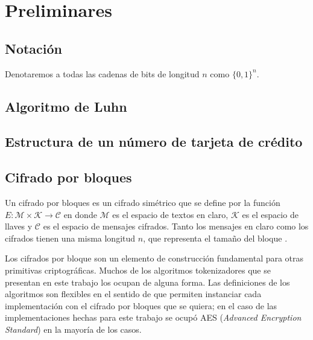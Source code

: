 %
%

\section{Preliminares}


\subsection{Notación}



Denotaremos a todas las cadenas de bits de longitud $ n $ como $ \{ 0, 1 \}^n $.

\subsection{Algoritmo de Luhn}


\subsection{Estructura de un número de tarjeta de crédito}

\subsection{Cifrado por bloques}

Un cifrado por bloques es un cifrado simétrico que se define por la función $ E:
\mathcal{M} \times \mathcal{K} \rightarrow \mathcal{C} $ en donde $ \mathcal{M} $
es el espacio de textos en claro, $ \mathcal{K} $ es el espacio de llaves y $
\mathcal{C} $ es el espacio de mensajes cifrados. Tanto los mensajes en claro
como los cifrados tienen una misma longitud $ n $, que representa el tamaño del
bloque \cite{menezes}.

Los cifrados por bloque son un elemento de construcción fundamental para otras
primitivas criptográficas. Muchos de los algoritmos tokenizadores que se
presentan en este trabajo los ocupan de alguna forma. Las definiciones de los
algoritmos son flexibles en el sentido de que permiten instanciar cada
implementación con el cifrado por bloques que se quiera; en el caso de las
implementaciones hechas para este trabajo se ocupó AES (\textit{Advanced
Encryption Standard}) en la mayoría de los casos.


